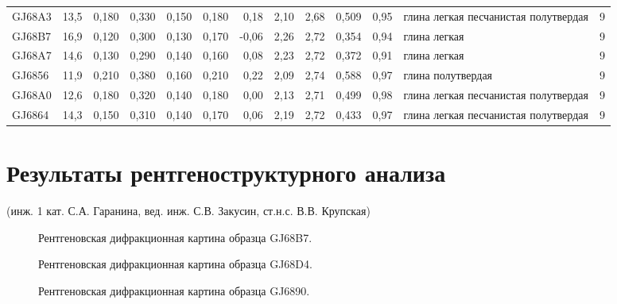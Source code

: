 \begin{sidewaystable}[p]
\begin{tabular}{@{}lrrrrrrrrrrlc@{}}
    GJ68A3          & 13,5       & 0,180                        & 0,330   & 0,150  & 0,180  & 0,18     & 2,10     & 2,68      & 0,509   & 0,95     & глина легкая   песчанистая полутвердая       & 9   \\ 
    GJ68B7          & 16,9       & 0,120                        & 0,300   & 0,130  & 0,170  & -0,06    & 2,26     & 2,72      & 0,354   & 0,94     & глина легкая       & 9   \\ 
    GJ68A7          & 14,6       & 0,130                        & 0,290   & 0,140  & 0,160  & 0,08     & 2,23     & 2,72      & 0,372   & 0,91     & глина легкая                              & 9   \\ 
    GJ6856          & 11,9       & 0,210                        & 0,380   & 0,160  & 0,210  & 0,22     & 2,09     & 2,74      & 0,588   & 0,97     & глина полутвердая                            & 9   \\ 
    GJ68A0          & 12,6       & 0,180                        & 0,320   & 0,140  & 0,180  & 0,00     & 2,13     & 2,71      & 0,499   & 0,98     & глина легкая   песчанистая полутвердая       & 9   \\ 
    GJ6864          & 14,3       & 0,150                        & 0,310   & 0,140  & 0,170  & 0,06     & 2,19     & 2,72      & 0,433   & 0,97     & глина легкая   песчанистая полутвердая       & 9   \\ 
    \bottomrule 
    \end{tabular}
    \end{sidewaystable}


\chapter{Результаты рентгеноструктурного анализа}\label{app:difrac}
(инж. 1 кат. С.А. Гаранина, вед. инж. С.В. Закусин, ст.н.с. В.В. Крупская)

\begin{figure}[ht]
    \caption{Рентгеновская дифракционная картина образца GJ68B7.}\label{fig:fig}
  \end{figure}

  \begin{figure}[ht]
    \caption{Рентгеновская дифракционная картина образца GJ68D4.}\label{fig:fig}
  \end{figure}

  \begin{figure}[ht]
    \caption{Рентгеновская дифракционная картина образца GJ6890.}\label{fig:fig}
  \end{figure}

